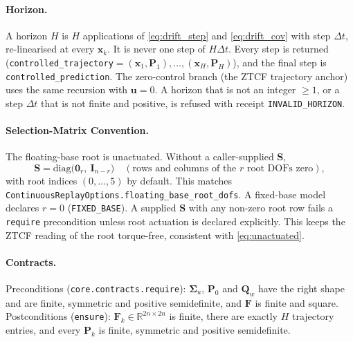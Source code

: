 \documentclass[11pt,a4paper]{article}
\newcommand{\R}{\mathbb{R}}
\newcommand{\bu}{\mathbf{u}}
\newcommand{\bx}{\mathbf{x}}
\newcommand{\bP}{\mathbf{P}}
\newcommand{\bS}{\mathbf{S}}
\begin{document}
\paragraph{Horizon.}  A horizon $H$ is $H$ applications of \eqref{eq:drift_step}
and \eqref{eq:drift_cov} with step $\Delta t$, re-linearised at every
$\bx_k$.  It is never one step of $H\Delta t$.  Every step is returned
(\texttt{controlled\_trajectory}$=(\bx_1,\bP_1),\dots,(\bx_H,\bP_H)$), and the
final step is \texttt{controlled\_prediction}.  The zero-control branch (the
ZTCF trajectory anchor) uses the same recursion with $\bu=0$.  A horizon that
is not an integer $\ge 1$, or a step $\Delta t$ that is not finite and positive,
is refused with receipt \texttt{INVALID\_HORIZON}.

\paragraph{Selection-Matrix Convention.}  The floating-base root is
unactuated.  Without a caller-supplied $\bS$,
\begin{equation}
  \bS=\mathrm{diag}\bigl(\mathbf 0_{r},\ \mathbf I_{n-r}\bigr)\quad
  (\text{rows and columns of the } r \text{ root DOFs zero}),
  \label{eq:selection_default}
\end{equation}
with root indices $(0,\dots,5)$ by default.  This matches
\texttt{ContinuousReplayOptions.floating\_base\_root\_dofs}.  A fixed-base model
declares $r=0$ (\texttt{FIXED\_BASE}).  A supplied $\bS$ with any non-zero root row
fails a \texttt{require} precondition unless root actuation is declared
explicitly.  This keeps the ZTCF reading of the root torque-free, consistent
with \eqref{eq:unactuated}.

\paragraph{Contracts.}  Preconditions (\texttt{core.contracts.require}):
$\boldsymbol\Sigma_u$, $\bP_0$ and $\mathbf Q_w$ have the right shape and are
finite, symmetric and positive semidefinite, and $\mathbf F$ is finite and square.
Postconditions (\texttt{ensure}): $\mathbf F_k\in\R^{2n\times2n}$ is finite,
there are exactly $H$ trajectory entries, and every $\bP_k$ is finite,
symmetric and positive semidefinite.
\end{document}
